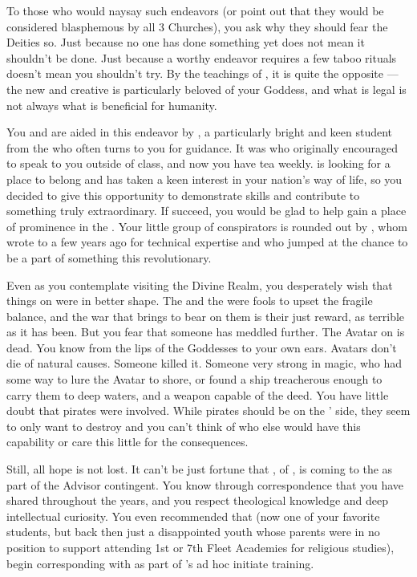 \documentclass[char]{GL2020}
\begin{document}
To those who would naysay such endeavors (or point out that they would be considered blasphemous by all 3 Churches), you ask why they should fear the Deities so. Just because no one has done something yet does not mean it shouldn't be done. Just because a worthy endeavor requires a few taboo rituals doesn't mean you shouldn't try. By the teachings of \cFlow{}, it is quite the opposite — the new and creative is particularly beloved of your Goddess, and what is legal is not always what is beneficial for humanity. 

You and \cCurse{} are aided in this endeavor by \cAmbition{\intro}, a particularly bright and keen student from the \pTech{} who often turns to you for guidance. It was \cWarlordDaughter{\intro} who originally encouraged \cAmbition{} to speak to you outside of class, and now you have tea weekly. \cAmbition{} is looking for a place to belong and has taken a keen interest in your nation’s way of life, so you decided to give \cAmbition{\them} this opportunity to demonstrate \cAmbition{\their} skills and contribute to something truly extraordinary. If \cAmbition{\they} succeed\cAmbition{\verbs}, you would be glad to help \cAmbition{\them} gain a place of prominence in the \pShip{}. Your little group of conspirators is rounded out by \cAssistantScientist{\intro}, whom \cCurse{} wrote to a few years ago for \cAssistantScientist{\their} technical expertise and who jumped at the chance to be a part of something this revolutionary. 

Even as you contemplate visiting the Divine Realm, you desperately wish that things on \pEarth{} were in better shape. The \pFarm{} and the \pTech{} were fools to upset the fragile balance, and the war that \cLoud{\intro} brings to bear on them is their just reward, as terrible as it has been. But you fear that someone has meddled further. The \cEbb{\intro} Avatar on \pEarth{} is dead. You know from the lips of the Goddesses to your own ears. Avatars don't die of natural causes. Someone killed it. Someone very strong in magic, who had some way to lure the Avatar to shore, or found a ship treacherous enough to carry them to deep waters, and a weapon capable of the deed. You have little doubt that pirates were involved. While pirates should be on the \pShip{}’ side, they seem to only want to destroy and you can’t think of who else would have this capability or care this little for the consequences.

Still, all hope is not lost. It can't be just fortune that \cEbbPriest{\intro}, \cEbbPriest{\cleric} of \cEbb{}, is coming to the \pSchool{} as part of the \pShip{} Advisor contingent. You know \cEbbPriest{} through correspondence that you have shared throughout the years, and you respect \cEbbPriest{\their} theological knowledge and deep intellectual curiosity. You even recommended that \cWarlordDaughter{\full} (now one of your favorite students, but back then just a disappointed youth whose parents were in no position to support \cWarlordDaughter{\their} attending 1st or 7th Fleet Academies for religious studies), begin corresponding with \cEbbPriest{\them} as part of \cWarlordDaughter{}’s ad hoc initiate training. 
\end{document}
